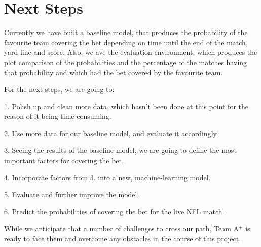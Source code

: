 \documentclass[runningheads]{llncs}
\begin{document}
\section{Next Steps}

Currently we have built a baseline model, that produces the probability of the favourite team covering the bet depending on time until the end of the match, yard line and score. Also, we ave the evaluation environment, which produces the plot comparison of the probabilities and the percentage of the matches having that probability and which had the bet covered by the favourite team.

For the next steps, we are going to:


1. Polish up and clean more data, which hasn't been done at this point for the reason of it being time consuming.

2. Use more data for our baseline model, and evaluate it accordingly.

3. Seeing the results of the baseline model, we are going to define the most important factors for covering the bet.

4. Incorporate factors from 3. into a new, machine-learning model.

5. Evaluate and further improve the model.

6. Predict the probabilities of covering the bet for the live NFL match.


While we anticipate that a number of challenges to cross our path, Team A$^+$ is ready to face them and overcome any obstacles in the course of this project.
\end{document}
